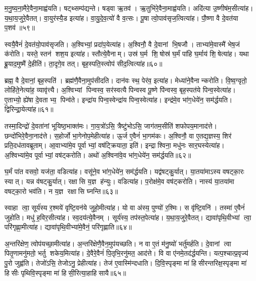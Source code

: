 म॒नु॒ष्य॒ना॒मैरे॒वैना॒माह्व॑यति। षट्थ्सम्प॑द्यन्ते। षड्वा ऋ॒तव॑। ऋ॒तुभि॑रे॒वैना॒माह्व॑यति। अदि॑त्या उ॒ष्णीष॑म॒सीत्या॑ह। य॒था॒य॒जुरे॒वैतत्। वा॒युर॑स्यै॒ड इत्या॑ह। वा॒यु॒दे॒व॒त्यो॑ वै व॒त्सः। पू॒षा त्वो॒पाव॑सृज॒त्वित्या॑ह। पौ॒ष्णा वै दे॒वत॑या प॒शव॑॥५९॥

स्वयै॒वैनं॑ दे॒वत॑यो॒पाव॑सृजति। अ॒श्विभ्यां॒ प्रदा॑प॒येत्या॑ह। अ॒श्विनौ॒ वै दे॒वानां भि॒षजौ। ताभ्या॑मे॒वास्मै॑ भेष॒जं क॑रोति। यस्ते॒ स्तन॑ शश॒य इत्या॑ह। स्तौत्ये॒वैनाम्। उस्र॑ घ॒र्म शि॒षोस्र॑ घ॒र्मं पा॑हि घ॒र्माय॑ शि॒षेत्या॑ह। यथा ब्रू॒याद॒मुष्मै॑ दे॒हीति॑। ता॒दृगे॒व तत्। बृह॒स्पति॒स्त्वोप॑ सीद॒त्वित्या॑ह॥६०॥

ब्रह्म॒ वै दे॒वानां॒ बृह॒स्पति॑। ब्रह्म॑णै॒वैना॒मुप॑सीदति। दान॑वः स्थ॒ पेर॑व॒ इत्या॑ह। मेध्या॑ने॒वैनान्करोति। वि॒ष्व॒ग्वृतो॒ लोहि॑ते॒नेत्या॑ह॒ व्यावृ॑त्त्यै। अ॒श्विभ्यां पिन्वस्व॒ सर॑स्वत्यै पिन्वस्व पू॒ष्णे पि॑न्वस्व॒ बृह॒स्पत॑ये पिन्व॒स्वेत्या॑ह। ए॒ताभ्यो॒ ह्ये॑षा दे॒वताभ्य॒ पिन्व॑ते। इन्द्रा॑य पिन्व॒स्वेन्द्रा॑य पिन्व॒स्वेत्या॑ह। इन्द्र॑मे॒व भा॑ग॒धेये॑न॒ सम॑र्द्धयति। द्विरिन्द्रा॒येत्या॑ह॥६१॥

तस्मा॒दिन्द्रो॑ दे॒वता॑नां भूयिष्ठ॒भाक्त॑मः। गा॒य॒त्रो॑ऽसि॒ त्रैष्टु॑भोऽसि॒ जाग॑तम॒सीति॑ शफोपय॒मानाद॑त्ते। छन्दो॑भि\-रे॒वैना॒नाद॑त्ते। स॒होर्जो भा॒गेनोप॒मेहीत्या॑ह। ऊ॒र्ज ए॒वैनं॑ भा॒गम॑कः। अ॒श्विनौ॒ वा ए॒तद्य॒ज्ञस्य॒ शिर॑ प्रति॒दध॑तावब्रूताम्। आ॒वाभ्या॑मे॒व पूर्वाभ्यां॒ वष॑ट्क्रियाता॒ इति॑। इन्द्राश्विना॒ मधु॑नः सार॒घस्येत्या॑ह। अ॒श्विभ्या॑मे॒व पूर्वाभ्यां॒ वष॑ट्करोति। अथो॑ अ॒श्विना॑वे॒व भा॑ग॒धेये॑न॒ सम॑र्द्धयति॥६२॥

घ॒र्मं पा॑त वसवो॒ यज॑ता॒ वडित्या॑ह। वसू॑ने॒व भा॑ग॒धेये॑न॒ सम॑र्द्धयति। यद्व॑षट्कु॒र्यात्। या॒तया॑माऽस्य वषट्का॒रः स्यात्। यन्न व॑षट्कु॒र्यात्। रक्षासि य॒ज्ञ ह॑न्युः। वडित्या॑ह। प॒रोक्ष॑मे॒व वष॑ट्करोति। नास्य॑ या॒तया॑मा वषट्का॒रो भव॑ति। न य॒ज्ञ रक्षासि घ्नन्ति॥६३॥

स्वाहा त्वा॒ सूर्य॑स्य र॒श्मये॑ वृष्टि॒वन॑ये जुहो॒मीत्या॑ह। यो वा अ॑स्य॒ पुण्यो॑ र॒श्मिः। स वृ॑ष्टि॒वनि॑। तस्मा॑ ए॒वैनं॑ जुहोति। मधु॑ ह॒विर॒सीत्या॑ह। स्व॒दय॑त्ये॒वैनम्। सूर्य॑स्य॒ तप॑स्त॒पेत्या॑ह। य॒था॒य॒जुरे॒वैतत्। द्यावा॑पृथि॒वीभ्यां त्वा॒ परि॑गृह्णा॒मीत्या॑ह। द्यावा॑पृथि॒वीभ्या॑मे॒वैनं॒ परि॑गृह्णाति॥६४॥

अ॒न्तरि॑क्षेण॒ त्वोप॑यच्छा॒मीत्या॑ह। अ॒न्तरि॑क्षेणै॒वैन॒मुप॑यच्छति। न वा ए॒तं म॑नु॒ष्यो॑ भर्तु॑मर्\mbox{}हति। दे॒वानां त्वा पितृ॒णामनु॑मतो॒ भर्तु शकेय॒मित्या॑ह। दे॒वैरे॒वैनं॑ पि॒तृभि॒रनु॑मत॒ आद॑त्ते। वि वा ए॑नमे॒तद॑र्द्धयन्ति। यत्प॒श्चात्प्र॒वृज्य॑ पु॒रो जुह्व॑ति। तेजो॑ऽसि॒ तेजोऽनु॒ प्रेहीत्या॑ह। तेज॑ ए॒वास्मि॑न्दधाति। दि॒वि॒स्पृङ्मा मा॑ हिसीरन्तरिक्ष॒स्पृङ्मा मा॑ हिसीः पृथिवि॒स्पृङ्मा मा॑ हिसी॒रित्या॒हाहिसायै॥६५॥

